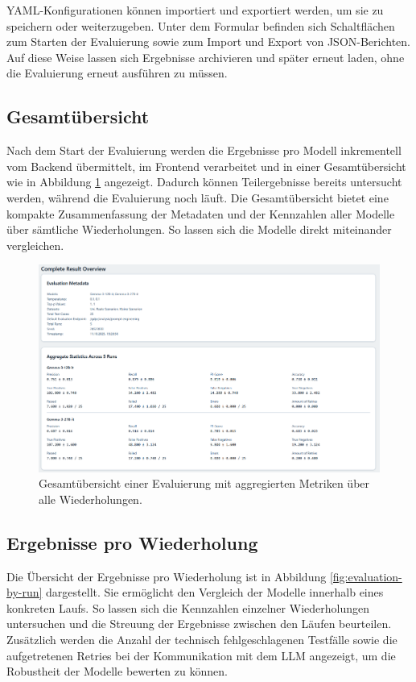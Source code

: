 YAML-Konfigurationen können importiert und exportiert werden, um sie zu speichern oder weiterzugeben. Unter dem Formular befinden sich Schaltflächen zum Starten der Evaluierung sowie zum Import und Export von JSON-Berichten. Auf diese Weise lassen sich Ergebnisse archivieren und später erneut laden, ohne die Evaluierung erneut ausführen zu müssen.

\subsection*{Gesamtübersicht}

Nach dem Start der Evaluierung werden die Ergebnisse pro Modell inkrementell vom Backend übermittelt, im Frontend verarbeitet und in einer Gesamtübersicht wie in Abbildung \ref{fig:evaluation-overview} angezeigt. Dadurch können Teilergebnisse bereits untersucht werden, während die Evaluierung noch läuft. Die Gesamtübersicht bietet eine kompakte Zusammenfassung der Metadaten und der Kennzahlen aller Modelle über sämtliche Wiederholungen. So lassen sich die Modelle direkt miteinander vergleichen.

\begin{figure}[h]
    \centering
    \includegraphics[width=\textwidth]{images/evaluation/evaluation-result-overview_new}
    \caption{Gesamtübersicht einer Evaluierung mit aggregierten Metriken über alle Wiederholungen.}
    \label{fig:evaluation-overview}
\end{figure}

\subsection*{Ergebnisse pro Wiederholung}

Die Übersicht der Ergebnisse pro Wiederholung ist in Abbildung \ref{fig:evaluation-by-run} dargestellt. Sie ermöglicht den Vergleich der Modelle innerhalb eines konkreten Laufs. So lassen sich die Kennzahlen einzelner Wiederholungen untersuchen und die Streuung der Ergebnisse zwischen den Läufen beurteilen. Zusätzlich werden die Anzahl der technisch fehlgeschlagenen Testfälle sowie die aufgetretenen Retries bei der Kommunikation mit dem \ac{LLM} angezeigt, um die Robustheit der Modelle bewerten zu können.

